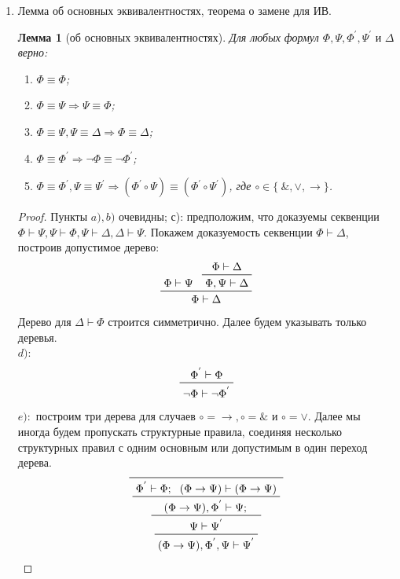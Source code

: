 \documentclass[a4paper]{article}
\newtheorem*{lemma*}{Лемма}
\theoremstyle{definition}
\begin{document}
\begin{enumerate}
 \item Лемма об основных эквивалентностях, теорема о замене для ИВ.
       \begin{lemma*}[об основных эквивалентностях]
        Для любых формул $\Phi, \Psi, \Phi^{'}, \Psi^{'} \text{ и } \Delta$ верно:
        \begin{enumerate}
         \item $\Phi \equiv \Phi$;
         \item $\Phi \equiv \Psi \Rightarrow \Psi \equiv \Phi$;
         \item $\Phi \equiv \Psi, \Psi \equiv \Delta \Rightarrow \Phi \equiv \Delta$;
         \item $\Phi \equiv \Phi^{'}\Rightarrow \lnot \Phi \equiv \lnot \Phi^{'}$;
         \item $\Phi \equiv \Phi^{'}, \Psi \equiv \Psi^{'} \Rightarrow (\Phi^{'} \circ \Psi) \equiv (\Phi^{'} \circ \Psi^{'})$, где $\circ \in \{\ \&, \vee, \rightarrow\}$.
        \end{enumerate}
       \end{lemma*}
       \begin{proof}
        Пункты $a), b)$ очевидны; с): предположим, что доказуемы секвенции $\Phi \vdash \Psi, \Psi \vdash \Phi, \Psi \vdash \Delta, \Delta \vdash \Psi$. Покажем доказуемость секвенции $\Phi \vdash \Delta$, построив допустимое дерево:\\
        \begin{displaymath}
         \prftree
         {\prfassumption{\Phi \vdash \Psi}} {\prftree{\prfassumption{\Phi \vdash \Delta}}{\Phi, \Psi \vdash \Delta}}
         {\Phi \vdash \Delta}
        \end{displaymath}
        Дерево для $\Delta \vdash \Phi$ строится симметрично. Далее будем указывать только деревья.\\
        $d):$
        \begin{displaymath}
         \prftree
         {\Phi^{'} \vdash \Phi}
         {\neg \Phi \vdash \neg \Phi^{'}}
        \end{displaymath}
        $e):$ построим три дерева для случаев $\circ = \rightarrow, \circ = \&$ и $\circ = \vee$. Далее мы иногда будем пропускать структурные правила, соединяя несколько структурных правил с одним основным или допустимым в один переход дерева.
        \begin{displaymath}
         \prftree
         {\prftree
          {\prftree
           {\Phi^{'} \vdash \Phi;}{(\Phi \rightarrow \Psi) \vdash (\Phi \rightarrow \Psi)}
           {(\Phi \rightarrow \Psi), \Phi^{'} \vdash \Psi;}} {\prftree{\Psi \vdash \Psi^{'}}{(\Phi \rightarrow \Psi), \Phi^{'}, \Psi \vdash \Psi^{'}}}
}
\end{displaymath}
\end{proof}
\end{enumerate}
\end{document}
